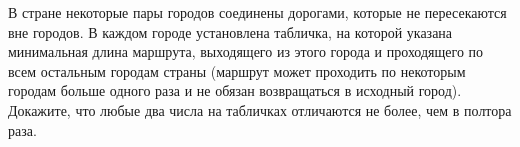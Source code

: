 \begin{exersize}
	В стране некоторые пары городов соединены дорогами, которые не пересекаются вне городов. В каждом городе установлена табличка, на которой указана минимальная длина маршрута, выходящего из этого города и проходящего по всем остальным городам страны (маршрут может проходить по некоторым городам больше одного раза и не обязан возвращаться в исходный город). Докажите, что любые два числа на табличках отличаются не более, чем в полтора раза.
\end{exersize}	  